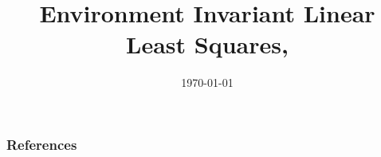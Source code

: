 \documentclass{beamer}
\title{Environment Invariant Linear Least Squares, \cite{fan2023environmentinvariantlinearsquares}}
\author{}
\institute{University of Connecticut}
\date{\today}
\begin{document}
\frame{\titlepage}




\begin{frame}[t,allowframebreaks]
  \frametitle{References}
  {}
\end{frame}
\end{document}
